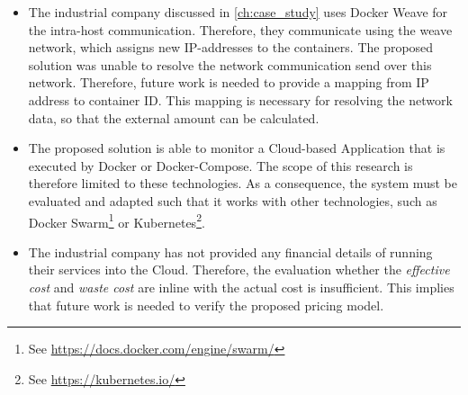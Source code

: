 \begin{itemize}
    \item The industrial company discussed in \autoref{ch:case_study} uses Docker Weave for the intra-host communication. Therefore, they communicate using the weave network, which assigns new IP-addresses to the containers. The proposed solution was unable to resolve the network communication send over this network. Therefore, future work is needed to provide a mapping from IP address to container ID. This mapping is necessary for resolving the network data, so that the external amount can be calculated.
    \item The proposed solution is able to monitor a Cloud-based Application that is executed by Docker or Docker-Compose. The scope of this research is therefore limited to these technologies. As a consequence, the system must be evaluated and adapted such that it works with other technologies, such as Docker Swarm\footnote{See \url{https://docs.docker.com/engine/swarm/}} or Kubernetes\footnote{See \url{https://kubernetes.io/}}.
    \item The industrial company has not provided any financial details of running their services into the Cloud. Therefore, the evaluation whether the \textit{effective cost} and \textit{waste cost} are inline with the actual cost is insufficient. This implies that future work is needed to verify the proposed pricing model.
\end{itemize}